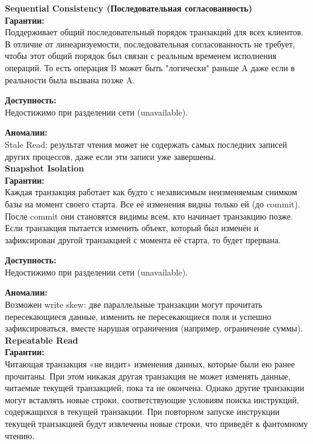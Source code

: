 \textbf{Sequential Consistency (Последовательная согласованность)}~\\

\textbf{Гарантии:}  ~\\
Поддерживает общий последовательный порядок транзакций для всех клиентов. В отличие от линеаризуемости, последовательная согласованность не требует, чтобы этот общий порядок был связан
 с реальным временем исполнения операций. То есть операция B может быть "логически" раньше A даже если в реальности была вызвана позже A.

 \textbf{Доступность:}  ~\\
Недостижимо при разделении сети (unavailable).  

\textbf{Аномалии:}  ~\\
Stale Read: результат чтения может не содержать самых последних записей других процессов, даже если эти записи уже завершены.\autocite{jepsen-sequential}~\\

\textbf{Snapshot Isolation}~\\

\textbf{Гарантии:}  ~\\
Каждая транзакция работает как будто с независимым неизменяемым снимком базы на момент своего старта. Все её изменения видны только ей (до commit). 
После commit они становятся видимы всем, кто начинает транзакцию позже.
Если транзакция пытается изменить объект, который был изменён и зафиксирован другой транзакцией с момента её старта, то будет прервана.

\textbf{Доступность:}  ~\\
Недостижимо при разделении сети (unavailable).  

\textbf{Аномалии:}  ~\\
Возможен write skew: две параллельные транзакции могут прочитать пересекающиеся данные, изменить не пересекающиеся поля и успешно зафиксироваться, вместе нарушая ограничения (например, ограничение суммы).\autocite{jepsen-snapshot-isolation}~\\

\textbf{Repeatable Read}~\\

\textbf{Гарантии:}  ~\\
Читающая транзакция «не видит» изменения данных, которые были ею ранее прочитаны. При этом никакая другая транзакция не может изменять данные, читаемые текущей транзакцией, пока та не окончена.
Однако другие транзакции могут вставлять новые строки, соответствующие условиям поиска инструкций, содержащихся в текущей транзакции. При повторном запуске инструкции текущей транзакцией будут 
извлечены новые строки, что приведёт к фантомному чтению.  

